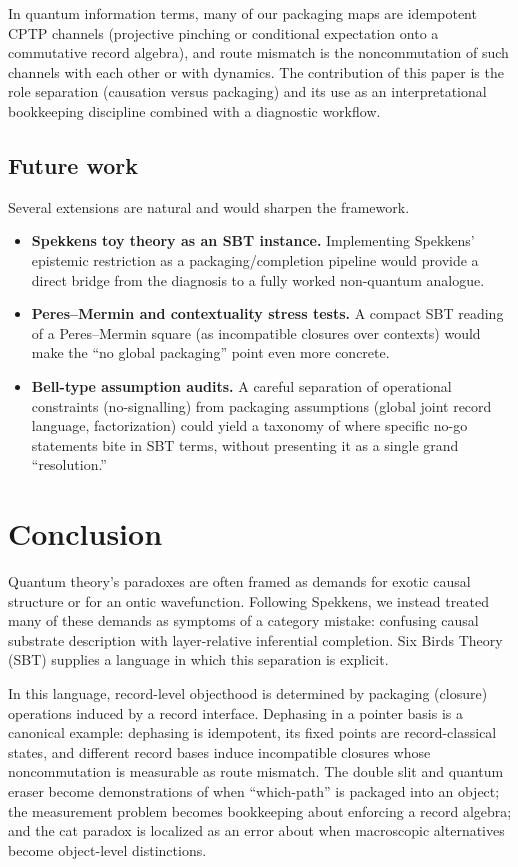 \documentclass[11pt]{article}
\begin{document}
In quantum information terms, many of our packaging maps are idempotent CPTP channels (projective pinching or conditional expectation onto a commutative record algebra), and route mismatch is the noncommutation of such channels with each other or with dynamics. The contribution of this paper is the role separation (causation versus packaging) and its use as an interpretational bookkeeping discipline combined with a diagnostic workflow.

\subsection{Future work}

Several extensions are natural and would sharpen the framework.

\begin{itemize}
  \item \textbf{Spekkens toy theory as an SBT instance.} Implementing Spekkens' epistemic restriction as a packaging/completion pipeline would provide a direct bridge from the diagnosis to a fully worked non-quantum analogue.
  \item \textbf{Peres--Mermin and contextuality stress tests.} A compact SBT reading of a Peres--Mermin square (as incompatible closures over contexts) would make the ``no global packaging'' point even more concrete.\cite{Mermin1990}
  \item \textbf{Bell-type assumption audits.} A careful separation of operational constraints (no-signalling) from packaging assumptions (global joint record language, factorization) could yield a taxonomy of where specific no-go statements bite in SBT terms, without presenting it as a single grand ``resolution.''
\end{itemize}
 \section{Conclusion}\label{sec:conclusion}

Quantum theory's paradoxes are often framed as demands for exotic causal structure or for an ontic wavefunction.
Following Spekkens, we instead treated many of these demands as symptoms of a category mistake: confusing causal substrate description with layer-relative inferential completion.
Six Birds Theory (SBT) supplies a language in which this separation is explicit.

In this language, record-level objecthood is determined by packaging (closure) operations induced by a record interface.
Dephasing in a pointer basis is a canonical example: dephasing is idempotent, its fixed points are record-classical states, and different record bases induce incompatible closures whose noncommutation is measurable as route mismatch.
The double slit and quantum eraser become demonstrations of when ``which-path'' is packaged into an object; the measurement problem becomes bookkeeping about enforcing a record algebra; and the cat paradox is localized as an error about when macroscopic alternatives become object-level distinctions.
\end{document}
